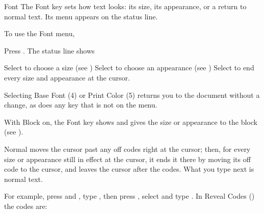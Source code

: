\begin{Feature}{Font}
The Font key sets how text looks: its size, its appearance, or a return to
normal text.  Its menu appears on the status line.

To use the Font menu,
\begin{WPSteps}
\item Press .  The status line shows
\item Select  to choose a size (see )
\Or
Select  to choose an appearance (see )
\Or
Select  to end every size and appearance at the cursor.
\end{WPSteps}

\Notes
{}
Selecting Base Font (4) or Print Color (5) returns you to the document
without a change, as does any key that is not on the menu.

With Block on, the Font key shows 
and gives the size or appearance to the block (see ).

Normal moves the cursor past any off codes right at the cursor; then, for
every size or appearance still in effect at the cursor, it ends it there by
moving its off code to the cursor, and leaves the cursor after the codes.
What you type next is normal text.

For example, press  and , type
, then press , select 
and type .  In Reveal Codes () the
codes are:
\EndReplay

\end{Feature}

